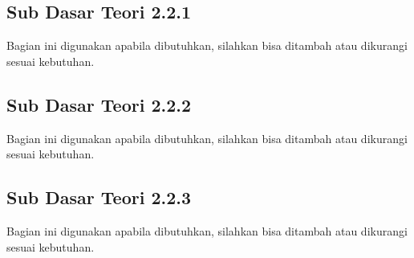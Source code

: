 \subsection{Sub Dasar Teori 2.2.1}
Bagian ini digunakan apabila dibutuhkan, silahkan bisa ditambah atau dikurangi sesuai kebutuhan.

\subsection{Sub Dasar Teori 2.2.2}
Bagian ini digunakan apabila dibutuhkan, silahkan bisa ditambah atau dikurangi sesuai kebutuhan.

\subsection{Sub Dasar Teori 2.2.3}
Bagian ini digunakan apabila dibutuhkan, silahkan bisa ditambah atau dikurangi sesuai kebutuhan.